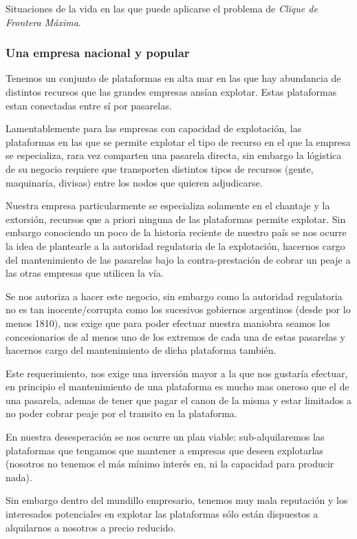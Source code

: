 Situaciones de la vida en las que puede aplicarse el problema
de \emph{Clique de Frontera M\'axima}.

\subsubsection{Una empresa nacional y popular}

Tenemos un conjunto de plataformas en alta mar en las
que hay abundancia de distintos recursos que las grandes
empresas ans\'ian explotar. Estas plataformas estan conectadas 
entre sí por pasarelas. 

Lamentablemente para las empresas con capacidad de explotaci\'on, 
las plataformas en las que se permite explotar el tipo de recurso
en el que la empresa se especializa, rara vez comparten una pasarela
directa, sin embargo la l\'ogistica de su negocio requiere que 
transporten distintos tipos de recursos (gente, maquinaria, divisas) 
entre los nodos que quieren adjudicarse.

Nuestra empresa particularmente se especializa solamente
en el chantaje y la extorsi\'on, recursos que a priori
ninguna de las plataformas permite explotar. Sin embargo
conociendo un poco de la historia reciente de nuestro pa\'is
se nos ocurre la idea de plantearle a la autoridad regulatoria
de la explotaci\'on, hacernos cargo del mantenimiento de las 
pasarelas bajo la contra-prestaci\'on de cobrar un peaje
a las otras empresas que utilicen la v\'ia.

Se nos autoriza a hacer este negocio, sin embargo como la 
autoridad regulatoria no es tan inocente/corrupta como los
sucesivos gobiernos argentinos (desde por lo menos 1810), 
nos exige que para poder efectuar nuestra maniobra seamos 
los concesionarios de al menos uno de los extremos de cada
una de estas pasarelas y hacernos cargo del mantenimiento
de dicha plataforma tambi\'en.

Este requerimiento, nos exige una inversi\'on mayor a la
que nos gustar\'ia efectuar, en principio el mantenimiento
de una plataforma es mucho mas oneroso que el de una pasarela,
ademas de tener que pagar el canon de la misma y estar limitados
a no poder cobrar peaje por el transito en la plataforma.

En nuestra desesperaci\'on se nos ocurre un plan viable:
sub-alquilaremos las plataformas que tengamos que mantener
a empresas que deseen explotarlas (nosotros no tenemos el 
m\'as m\'inimo inter\'es en, ni la capacidad para producir nada). 

Sin embargo dentro del mundillo empresario, tenemos muy 
mala reputaci\'on y los interesados potenciales en explotar
las plataformas s\'olo est\'an dispuestos a alquilarnos a
nosotros a precio reducido. 

